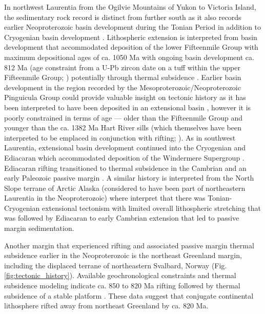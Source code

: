 \documentclass[twocolumn, switch]{article} %
\begin{document}
In northwest Laurentia from the Ogilvie Mountains of Yukon to Victoria Island, the sedimentary rock record is distinct from further south as it also records earlier Neoproterozoic basin development during the Tonian Period in addition to Cryogenian basin development \citep{Macdonald2012a}. Lithospheric extension is interpreted from basin development that accommodated deposition of the lower Fifteenmile Group with maximum depositional ages of ca. 1050 Ma with ongoing basin development ca. 812 Ma (age constraint from a U-Pb zircon date on a tuff within the upper Fifteenmile Group; \citealp{Macdonald2010a}) potentially through thermal subsidence \citep{Macdonald2012a}. Earlier basin development in the region recorded by the Mesoproterozoic/Neoproterozoic Pinguicula Group could provide valuable insight on tectonic history as it has been interpreted to have been deposited in an extensional basin \citep{Medig2016a}, however it is poorly constrained in terms of age --- older than the Fifteenmile Group and younger than the ca. 1382 Ma Hart River sills (which themselves have been interpreted to be emplaced in conjunction with rifting; \citealp{Verbaas2018a}). As in southwest Laurentia, extensional basin development continued into the Cryogenian and Ediacaran which accommodated deposition of the Windermere Supergroup \citep{Moynihan2019a}. Ediacaran rifting transitioned to thermal subsidence in the Cambrian and an early Paleozoic passive margin \citep{Moynihan2019a}. A similar history is interpreted from the North Slope terrane of Arctic Alaska (considered to have been part of northeastern Laurentia in the Neoproterozoic) where \cite{Strauss2019a} interpret that there was Tonian-Cryogenian extensional tectonism with limited overall lithospheric stretching that was followed by Ediacaran to early Cambrian extension that led to passive margin sedimentation.

Another margin that experienced rifting and associated passive margin thermal subsidence earlier in the Neoproterozoic is the northeast Greenland margin, including the displaced terrane of northeastern Svalbard, Norway (Fig. \ref{fig:tectonic_history}). Available geochronological constraints and thermal subsidence modeling indicate ca. 850 to 820 Ma rifting followed by thermal subsidence of a stable platform \citep{Maloof2006a, Halverson2018a}. These data suggest that conjugate continental lithosphere rifted away from northeast Greenland by ca. 820 Ma.
\end{document}

